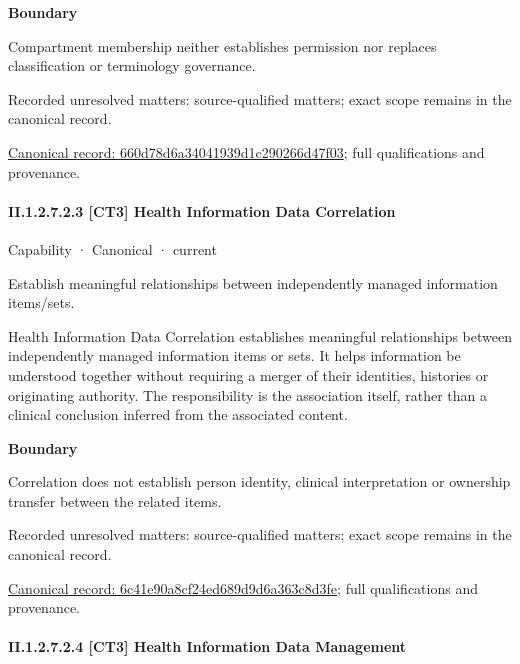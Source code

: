 \textbf{Boundary}



Compartment membership neither establishes permission nor replaces classification or terminology governance.


{\small Recorded unresolved matters: source-qualified matters; exact scope remains in the canonical record.}\par
{\footnotesize \href{../../../../../../../continuum/strategy/capability/660d78d6a34041939d1c290266d47f03.md}{Canonical record: 660d78d6a34041939d1c290266d47f03}; full qualifications and provenance.}\par
\paragraph*{II.1.2.7.2.3 [CT3] Health Information Data Correlation}
\label{navigation:II.1.2.7.2.3}

\label{element:6c41e90a8cf24ed689d9d6a363c8d3fe}
{\small Capability · Canonical · current}\par

Establish meaningful relationships between independently managed information items/sets.



Health Information Data Correlation establishes meaningful relationships between independently managed information items or sets. It helps information be understood together without requiring a merger of their identities, histories or originating authority. The responsibility is the association itself, rather than a clinical conclusion inferred from the associated content.



\textbf{Boundary}



Correlation does not establish person identity, clinical interpretation or ownership transfer between the related items.


{\small Recorded unresolved matters: source-qualified matters; exact scope remains in the canonical record.}\par
{\footnotesize \href{../../../../../../../continuum/strategy/capability/6c41e90a8cf24ed689d9d6a363c8d3fe.md}{Canonical record: 6c41e90a8cf24ed689d9d6a363c8d3fe}; full qualifications and provenance.}\par
\paragraph*{II.1.2.7.2.4 [CT3] Health Information Data Management}
\label{navigation:II.1.2.7.2.4}

